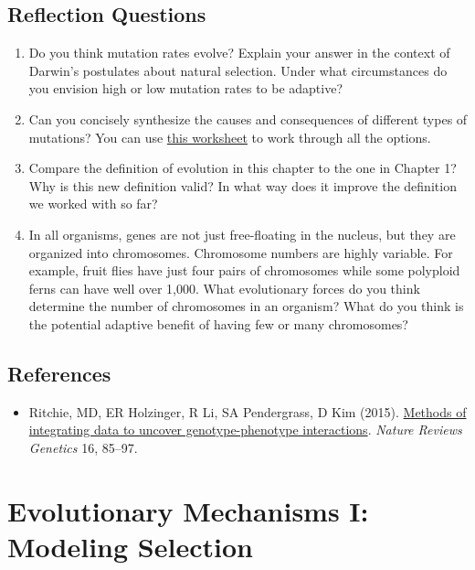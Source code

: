 \documentclass[
]{book}
\providecommand{\tightlist}{%
  \setlength{\itemsep}{0pt}\setlength{\parskip}{0pt}}
\begin{document}
\hypertarget{reflection-questions-3}{%
\section{Reflection Questions}\label{reflection-questions-3}}

\begin{enumerate}
\def\labelenumi{\arabic{enumi}.}
\tightlist
\item
  Do you think mutation rates evolve? Explain your answer in the context of Darwin's postulates about natural selection. Under what circumstances do you envision high or low mutation rates to be adaptive?
\item
  Can you concisely synthesize the causes and consequences of different types of mutations? You can use \href{exercises/mutation_worksheet.pdf}{this worksheet} to work through all the options.
\item
  Compare the definition of evolution in this chapter to the one in Chapter 1? Why is this new definition valid? In what way does it improve the definition we worked with so far?
\item
  In all organisms, genes are not just free-floating in the nucleus, but they are organized into chromosomes. Chromosome numbers are highly variable. For example, fruit flies have just four pairs of chromosomes while some polyploid ferns can have well over 1,000. What evolutionary forces do you think determine the number of chromosomes in an organism? What do you think is the potential adaptive benefit of having few or many chromosomes?
\end{enumerate}

\hypertarget{references-4}{%
\section{References}\label{references-4}}

\begin{itemize}
\tightlist
\item
  Ritchie, MD, ER Holzinger, R Li, SA Pendergrass, D Kim (2015). \href{https://www.nature.com/articles/nrg3868}{Methods of integrating data to uncover genotype-phenotype interactions}. \emph{Nature Reviews Genetics} 16, 85--97.
\end{itemize}

\hypertarget{evolutionary-mechanisms-i-modeling-selection}{%
\chapter{Evolutionary Mechanisms I: Modeling Selection}\label{evolutionary-mechanisms-i-modeling-selection}}
\end{document}
